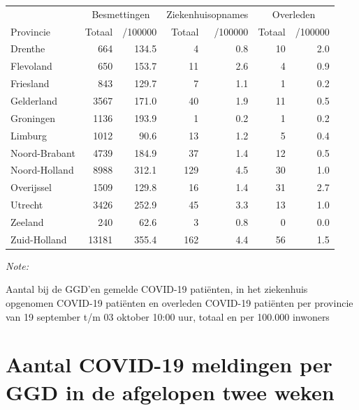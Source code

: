 \documentclass[
  english,
  man,floatsintext]{apa6}
\begin{document}
\begin{table}[H]
\centering
\begin{threeparttable}
\begin{tabular}{lrrrrrr}
\toprule
\multicolumn{1}{c}{ } & \multicolumn{2}{c}{Besmettingen} & \multicolumn{2}{c}{Ziekenhuisopnames} & \multicolumn{2}{c}{Overleden} \\
\cmidrule(l{3pt}r{3pt}){2-3} \cmidrule(l{3pt}r{3pt}){4-5} \cmidrule(l{3pt}r{3pt}){6-7}
Provincie & Totaal & /100000 & Totaal & /100000 & Totaal & /100000\\
\midrule
Drenthe & 664 & 134.5 & 4 & 0.8 & 10 & 2.0\\
Flevoland & 650 & 153.7 & 11 & 2.6 & 4 & 0.9\\
Friesland & 843 & 129.7 & 7 & 1.1 & 1 & 0.2\\
Gelderland & 3567 & 171.0 & 40 & 1.9 & 11 & 0.5\\
Groningen & 1136 & 193.9 & 1 & 0.2 & 1 & 0.2\\
Limburg & 1012 & 90.6 & 13 & 1.2 & 5 & 0.4\\
Noord-Brabant & 4739 & 184.9 & 37 & 1.4 & 12 & 0.5\\
Noord-Holland & 8988 & 312.1 & 129 & 4.5 & 30 & 1.0\\
Overijssel & 1509 & 129.8 & 16 & 1.4 & 31 & 2.7\\
Utrecht & 3426 & 252.9 & 45 & 3.3 & 13 & 1.0\\
Zeeland & 240 & 62.6 & 3 & 0.8 & 0 & 0.0\\
Zuid-Holland & 13181 & 355.4 & 162 & 4.4 & 56 & 1.5\\
\bottomrule
\end{tabular}
\begin{tablenotes}
\item \textit{Note: } 
\item Aantal bij de GGD’en gemelde COVID-19 patiënten, in het ziekenhuis opgenomen COVID-19 patiënten en overleden COVID-19 patiënten per provincie van 19 september t/m 03 oktober 10:00 uur, totaal en per 100.000 inwoners
\end{tablenotes}
\end{threeparttable}
\end{table}

\newpage

\hypertarget{aantal-covid-19-meldingen-per-ggd-in-de-afgelopen-twee-weken}{%
\section{Aantal COVID-19 meldingen per GGD in de afgelopen twee weken}\label{aantal-covid-19-meldingen-per-ggd-in-de-afgelopen-twee-weken}}
\end{document}
